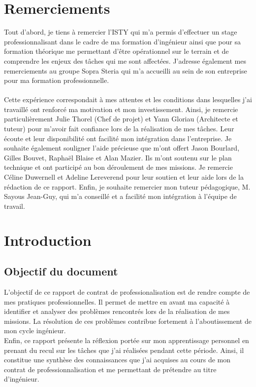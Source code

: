 \documentclass[12pt,a4paper]{article}
\begin{document}
\section{Remerciements}
Tout d'abord, je tiens à remercier l'\gls{ISTY} qui m'a permis d'effectuer un stage professionnalisant dans le cadre de ma formation d'ingénieur ainsi que pour sa formation théorique me permettant d'être opérationnel sur le terrain et de comprendre les enjeux des tâches qui me sont affectées. J'adresse également mes remerciements au groupe Sopra Steria qui m'a accueilli au sein de son entreprise pour ma formation professionnelle.\\\\ Cette expérience correspondait à mes attentes et les conditions dans lesquelles j'ai travaillé ont renforcé ma motivation et  mon investissement. Ainsi, je remercie particulièrement Julie Thorel (Chef de projet) et Yann Gloriau (Architecte et tuteur) pour m'avoir fait confiance lors de la réalisation de mes tâches. Leur écoute et leur disponibilité ont facilité mon intégration dans l'entreprise. Je souhaite également souligner l'aide précieuse que m'ont offert Jason Bourlard, Gilles Bouvet, Raphaël Blaise et Alan Mazier. Ils m'ont soutenu sur le plan technique et ont participé au bon déroulement de mes missions.
\medbreak
Je remercie Céline Duwernell et Adeline Lereverend pour leur soutien et leur aide lors de la rédaction de ce rapport.
\smallbreak
Enfin, je souhaite remercier mon tuteur pédagogique,  M. Sayous Jean-Guy, qui m'a conseillé et a facilité mon intégration à l'équipe de travail. 
\newpage
\section{Introduction}
\subsection{Objectif du document}
L'objectif de ce rapport de contrat de professionalisation est de rendre compte de mes pratiques professionnelles. Il permet de mettre en avant ma capacité à identifier et analyser des problèmes rencontrés lors de la réalisation de mes missions. La résolution de ces problèmes contribue fortement à l'aboutissement de mon cycle ingénieur.\\
Enfin, ce rapport présente la réflexion portée sur mon apprentissage personnel en prenant du recul sur les tâches que j'ai réalisées pendant cette période. 
Ainsi, il constitue une synthèse des connaissances que j'ai acquises au cours de mon contrat de professionnalisation et me permettant de prétendre au titre d'ingénieur.
\end{document}
